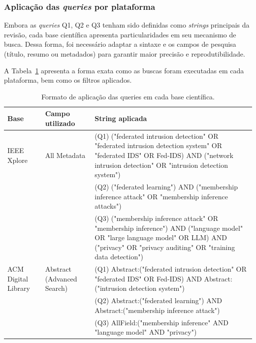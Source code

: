 \documentclass[
	12pt,				%
	openright,			%
	oneside,			%
	a4paper,			%
	english,			%
	french,				%
	spanish,			%
	brazil,				%
	]{abntex2}
\begin{document}
\subsubsection{Aplicação das \textit{queries} por plataforma}

Embora as \textit{queries} Q1, Q2 e Q3 tenham sido definidas como \textit{strings} principais da revisão,
cada base científica apresenta particularidades em seu mecanismo de busca. Dessa forma,
foi necessário adaptar a sintaxe e os campos de pesquisa (título, resumo ou metadados)
para garantir maior precisão e reprodutibilidade.

A Tabela~\ref{tab:queries_plataformas} apresenta a forma exata como as buscas foram
executadas em cada plataforma, bem como os filtros aplicados.

\begin{table}[H]
\centering
\caption{Formato de aplicação das queries em cada base científica.}
\label{tab:queries_plataformas}
\renewcommand{\arraystretch}{1.3}
\begin{tabular}{p{3cm} p{4cm} p{7cm}}
\hline
\textbf{Base} & \textbf{Campo utilizado} & \textbf{String aplicada} \\
\hline

IEEE Xplore &
All Metadata &
(Q1) ("federated intrusion detection" OR "federated intrusion detection system" OR
"federated IDS" OR Fed-IDS) AND ("network intrusion detection" OR "intrusion detection system") \\

& &
(Q2) ("federated learning") AND ("membership inference attack" OR "membership inference attacks") \\

& &
(Q3) ("membership inference attack" OR "membership inference") AND ("language model" OR "large language model" OR LLM) AND ("privacy" OR "privacy auditing" OR "training data detection") \\
\hline

ACM Digital Library &
Abstract (Advanced Search) &
(Q1) Abstract:("federated intrusion detection" OR "federated IDS" OR Fed-IDS)
AND Abstract:("intrusion detection system") \\

& &
(Q2) Abstract:("federated learning")
AND Abstract:("membership inference attack") \\

& &
(Q3) AllField:("membership inference" AND "language model" AND "privacy") \\
\hline


\end{tabular}
\end{table}
\end{document}
